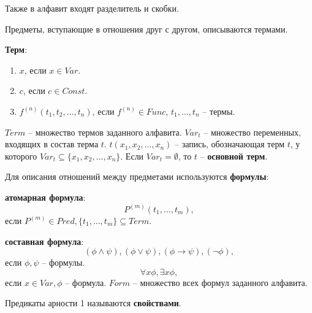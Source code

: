 \documentclass[11pt]{article}
\begin{document}
Также в алфавит входят разделитель и скобки.

Предметы, вступающие в отношения друг с другом, описываются термами.

\textbf{Терм}:
\begin{enumerate}
\item \(x\), если \(x \in Var\).
\item \(c\), если \(c \in Const\).
\item \(f^{(n)}(t_1, t_2, \ldots, t_n)\), если \(f^{(n)} \in Func\), \(t_1, \ldots, t_n\) -- термы.
\end{enumerate}

\(Term\) -- множество термов заданного алфавита. \(Var_t\) -- множество переменных, входящих в состав терма \(t\). \(t(x_1, x_2, \ldots, x_n)\) -- запись, обозначающая терм \(t\), у которого \(Var_t \subseteq \{x_1, x_2, \ldots, x_n\}\). Если \(Var_t = \emptyset\), то \(t\) -- \textbf{основной терм}.

Для описания отношений между предметами используются \textbf{формулы}:

\textbf{атомарная формула}:
\begin{equation*}
P^{(m)}(t_1, \ldots, t_m),
\end{equation*}
если \(P^{(m)} \in Pred, \{t_1, \ldots, t_m\} \subseteq Term\).

\textbf{составная формула}:
\begin{equation*}
(\phi \land \psi), (\phi \lor \psi), (\phi \to \psi), (\neg \phi),
\end{equation*}
если \(\phi, \psi\) -- формулы.
\begin{equation*}
\forall x \phi, \exists x \phi,
\end{equation*}
если \(x \in Var, \phi\) -- формула. \(Form\) -- множество всех формул заданного алфавита.

Предикаты арности 1 называются \textbf{свойствами}.
\end{document}
